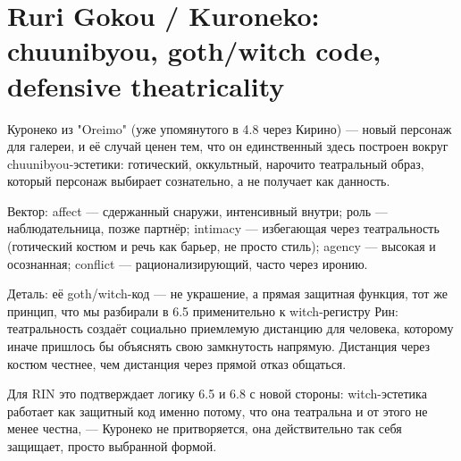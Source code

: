\section{Ruri Gokou / Kuroneko: chuunibyou, goth/witch code, defensive theatricality}

Куронеко из "Oreimo" (уже упомянутого в 4.8 через Кирино) — новый персонаж для галереи, и её случай ценен тем, что он единственный здесь построен вокруг chuunibyou-эстетики: готический, оккультный, нарочито театральный образ, который персонаж выбирает сознательно, а не получает как данность.

Вектор: affect — сдержанный снаружи, интенсивный внутри; роль — наблюдательница, позже партнёр; intimacy — избегающая через театральность (готический костюм и речь как барьер, не просто стиль); agency — высокая и осознанная; conflict — рационализирующий, часто через иронию.

Деталь: её goth/witch-код — не украшение, а прямая защитная функция, тот же принцип, что мы разбирали в 6.5 применительно к witch-регистру Рин: театральность создаёт социально приемлемую дистанцию для человека, которому иначе пришлось бы объяснять свою замкнутость напрямую. Дистанция через костюм честнее, чем дистанция через прямой отказ общаться.

Для RIN это подтверждает логику 6.5 и 6.8 с новой стороны: witch-эстетика работает как защитный код именно потому, что она театральна и от этого не менее честна, — Куронеко не притворяется, она действительно так себя защищает, просто выбранной формой.
